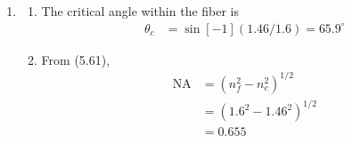 \documentclass{homework}
\begin{document}
\begin{enumerate}
		\item \begin{enumerate}
			\item%
			The critical angle within the fiber is \begin{align*}
				\theta_c & = \sin[-1]( 1.46 / 1.6) = 65.9^\circ
			\end{align*}
		
			\item From (5.61), \begin{align*}
				\mathrm{NA} & = \left(n_f^2 - n_c^2\right)^{1/2} \\
					& = (1.6^2 - 1.46^2)^{1/2} \\
					& = 0.655
			\end{align*}
		\end{enumerate}		
	\end{enumerate}
\end{document}
